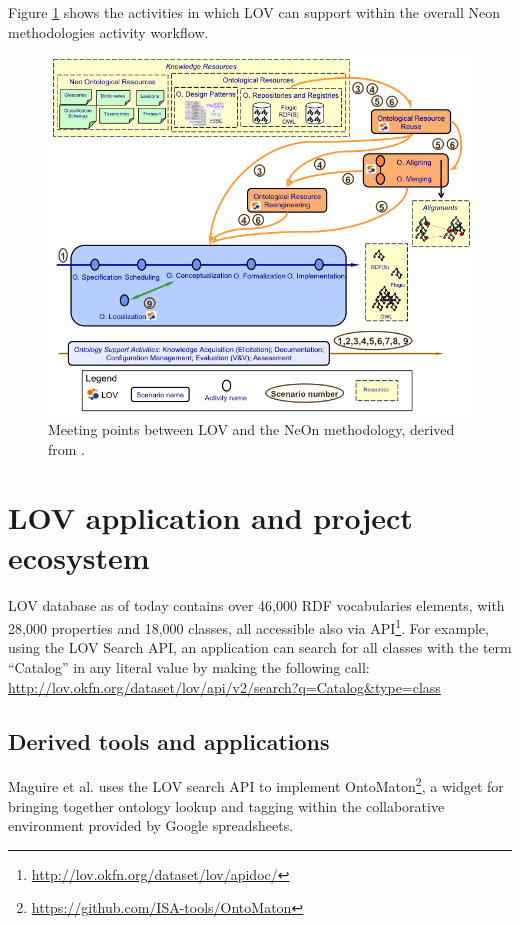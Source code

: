 \documentclass{iosart2c}
\newcommand{\py}[1]{\textcolor{olive}{\textbf{[PIERRE-YVES TO:#1]}}}
\begin{document}
Figure \ref{fig:LOVandNeOn} shows the activities in which LOV can support within the overall Neon methodologies activity workflow.
\begin{figure}[h!tp]
\centering
  \includegraphics[width=.80\linewidth]{neonScenarios.png}
  \caption{Meeting points between LOV and the NeOn methodology, derived from \cite{MC10}.}
  \label{fig:LOVandNeOn}
\end{figure}

\section{LOV application and project ecosystem}
\label{sec:lovecosystem}
LOV database as of today contains over 46,000 RDF vocabularies elements, with 28,000 properties and 18,000 classes, all accessible also via API\footnote{\url{http://lov.okfn.org/dataset/lov/apidoc/}}. For example, using the LOV Search API, an application can search for all classes with the term ``Catalog'' in any literal value by making the following call: \url{http://lov.okfn.org/dataset/lov/api/v2/search?q=Catalog&type=class}
 
\subsection{Derived tools and applications}

Maguire et al. \cite{ontomaton12} uses the LOV search API to implement OntoMaton\footnote{\url{https://github.com/ISA-tools/OntoMaton}}, a widget for bringing together ontology lookup and tagging within the collaborative environment provided by Google spreadsheets. 
\end{document}
